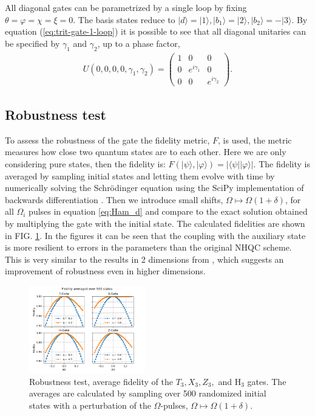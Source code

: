 \documentclass[pra,showpacs,priprent,twocolumn,superscriptaddress]{revtex4-1}
\newcommand{\ket}[1]{|#1\rangle}
\newcommand{\bra}[1]{\langle #1|}
\begin{document}
All diagonal gates can be parametrized by a single loop by fixing $\theta = \varphi = \chi = \xi = 0$. The basis states reduce to $\ket{d} = \ket{1}, \ket{b_1} = \ket{2}, \ket{b_2} = -\ket{3}$. By equation (\ref{eq:trit-gate-1-loop}) it is possible to see that all diagonal unitaries can be specified by $\gamma_1$ and $\gamma_2$, up to a phase factor,
\begin{eqnarray}
U(0,0,0,0,\gamma_1,\gamma_2) = \begin{pmatrix}
1&0&0
\\
0&e^{i\gamma_1}&0
\\
0&0&e^{i\gamma_2}
\end{pmatrix}.
\end{eqnarray}

\subsection{Robustness test}
To assess the robustness of the gate the fidelity metric, $F$, is used, the metric measures how close two quantum states are to each other. Here we are only considering pure states, then the fidelity is: $F(\ket{\psi},\ket{\varphi}) = |\bra{\psi}\ket{\varphi}|$. The fidelity is averaged by sampling initial states and letting them evolve with time by numerically solving the Schrödinger equation using the SciPy implementation of backwards differentiation \cite{shampine97}. Then we introduce small shifts, $\Omega \mapsto \Omega(1 + \delta)$, for all $\Omega_i$ pulses in equation \ref{eq:Ham_d} and compare to the exact solution obtained by multiplying the gate with the initial state. The calculated fidelities are shown in FIG. \ref{fig:fidelity}. In the figures it can be seen that the coupling with the auxiliary state is more resilient to errors in the parameters than the original NHQC scheme. This is very similar to the results in 2 dimensions from \cite{ai22}, which suggests an improvement of robustness even in higher dimensions.

\begin{figure}[h!]
\centering
\includegraphics[width=0.45\textwidth]{Fid500.png}
\caption{Robustness test, average fidelity of the $T_3,X_3,Z_3,$ and H$_3$ gates. The averages are calculated by sampling over 500 randomized initial states with a perturbation of the $\Omega$-pulses, $\Omega \mapsto \Omega(1+\delta)$.}
\label{fig:fidelity}
\end{figure}
\end{document}

